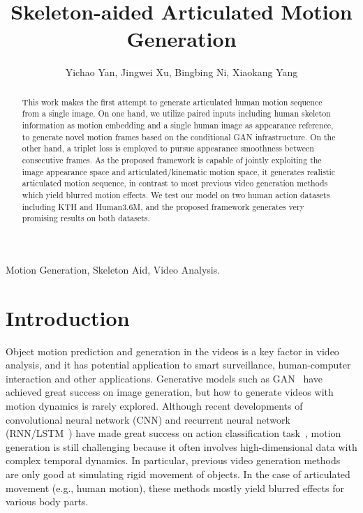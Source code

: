 \documentclass[journal]{IEEEtran}
\begin{document}
\title{Skeleton-aided Articulated Motion Generation}


\author{Yichao Yan, Jingwei Xu, Bingbing Ni, Xiaokang Yang}



\maketitle

\begin{abstract}
This work makes the first attempt to generate articulated human motion sequence from a single image. On one hand, we utilize paired inputs including human skeleton information as motion embedding and a single human image as appearance reference, to generate novel motion frames based on the conditional GAN infrastructure. On the other hand, a triplet loss is employed to pursue appearance smoothness between consecutive frames. As the proposed framework is capable of jointly exploiting the image appearance space and articulated/kinematic motion space, it generates realistic articulated motion sequence, in contrast to most previous video generation methods which yield blurred motion effects. We test our model on two human action datasets including KTH and Human3.6M, and the proposed framework generates very promising results on both datasets.
\end{abstract}

\begin{IEEEkeywords}
Motion Generation, Skeleton Aid, Video Analysis.
\end{IEEEkeywords}



\section{Introduction}
Object motion prediction and generation in the videos is a key factor in video analysis, and it has potential application to smart surveillance, human-computer interaction and other applications.
Generative models such as GAN~\cite{goodfellow2014generative} have achieved great success on image generation, but how to generate videos with motion dynamics is rarely explored.
Although recent developments of convolutional neural network (CNN) and recurrent neural network (RNN/LSTM~\cite{DBLP:journals/neco/HochreiterS97}) have made great success on action classification task~\cite{DBLP:conf/cvpr/KarpathyTSLSF14,DBLP:conf/mm/WuWJYX15,DBLP:journals/pami/DonahueHRVGSD17}, motion generation is still challenging because it often involves high-dimensional data with complex temporal dynamics.
In particular, previous video generation methods~\cite{DBLP:conf/icml/SrivastavaMS15,finn2016unsupervised,DBLP:conf/nips/VondrickPT16,DBLP:conf/nips/OhGLLS15} are only good at simulating rigid movement of objects. In the case of articulated movement (e.g., human motion), these methods mostly yield blurred effects for various body parts.
\end{document}

